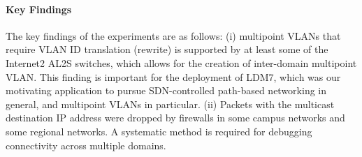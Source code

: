 \paragraph{Key Findings}
The key findings of the experiments are as follows: (i) multipoint VLANs that require VLAN ID translation (rewrite) is supported by at least some of the Internet2 AL2S switches, which allows for the creation of inter-domain multipoint VLAN. This finding is important for the deployment of LDM7, which was our motivating application to pursue SDN-controlled path-based networking in general, and multipoint VLANs in particular. (ii) Packets with the multicast destination IP address were dropped by firewalls in some campus networks and some regional networks. A systematic method is required for debugging connectivity across multiple domains.

